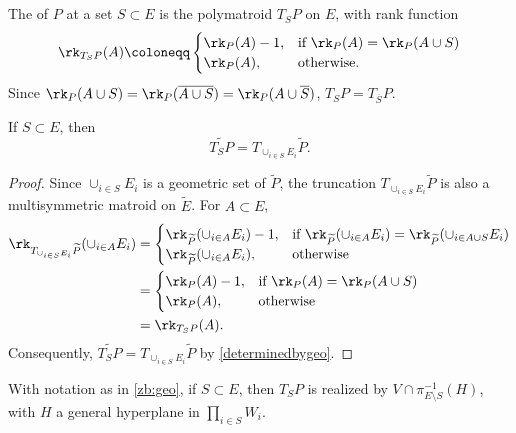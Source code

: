 \subsection{}\label{sec:truncation} The  of $P$ at a set $S \subset E$ is the polymatroid $T_S P$ on $E$, with rank function
\[
  \rk_{T_SP}(A) \coloneqq
  \begin{cases}
    \rk_P(A) - 1, & \text{if $\rk_P(A) = \rk_P(A \cup S)$} \\
    \rk_P(A), & \text{otherwise.}
  \end{cases}
\]
Since $\rk_P(A \cup S) = \rk_P(\overline{A \cup S}) = \rk_P(A \cup \overline S)$, $T_S P = T_{\overline S} P$.
\begin{lemm}\label{truncationcommutes}
  If $S \subset E$, then 
  \[
  \widetilde{T_S P} = T_{\cup_{i \in S} E_i} \widetilde P.
  \]
\end{lemm}
\begin{proof}
    Since $\cup_{i \in S} E_i$ is a geometric set of $\widetilde P$, the truncation $T_{\cup_{i \in S} E_i} \widetilde P$ is also a multisymmetric matroid on $\widetilde E$.
  For $A \subset E$,
\begin{align*}
    \rk_{T_{\cup_{i \in S} E_i} \widetilde P}(\cup_{i \in A} E_i)
    &=
    \begin{cases}
      \rk_{\widetilde P}(\cup_{i \in A} E_i) - 1, & \text{if $\rk_{\widetilde P}(\cup_{i \in A} E_i) = \rk_{\widetilde P}(\cup_{i \in A\cup S} E_i)$} \\
      \rk_{\widetilde P}(\cup_{i \in A} E_i), & \text{otherwise}
    \end{cases} \\
    &= \begin{cases}
      \rk_{P}(A) - 1, & \text{if $\rk_{P}(A) = \rk_{P}(A \cup S)$} \\
      \rk_{P}(A), & \text{otherwise}
      \end{cases}\\
    &= \rk_{T_SP}(A).
\end{align*}
  Consequently, $\widetilde{T_S P} = T_{\cup_{i \in S} E_i} \widetilde P$ by \cref{determinedbygeo}.
\end{proof}
  

\begin{rema}\label{opsgeometry}
  With notation as in \cref{zb:geo}, if $S \subset E$, then $T_S P$ is realized by $V \cap \pi^{-1}_{E \setminus S}(H)$, with $H$ a general hyperplane in $\prod_{i \in S} W_i$.
\end{rema}

